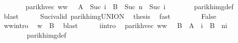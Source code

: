 \begin{isabellebody}
\ \ \ \ \isamarkupfalse%
\ \isamarkupfalse%
\ {\isachardoublequoteopen}parikh{\isacharunderscore}{\kern0pt}vec\ {\isacharparenleft}{\kern0pt}w{}{\isacharat}{\kern0pt}w{}{\isacharprime}{\kern0pt}{\isacharparenright}{\kern0pt}\ {\isasymin}\ {\isasymPsi}\ {\isacharparenleft}{\kern0pt}A\ {\isacharcircum}{\kern0pt}{\isacharcircum}{\kern0pt}\ {\isacharparenleft}{\kern0pt}Suc\ i{\isacharparenright}{\kern0pt}\ {\isacharat}{\kern0pt}{\isacharat}{\kern0pt}\ B\ {\isacharcircum}{\kern0pt}{\isacharcircum}{\kern0pt}\ {\isacharparenleft}{\kern0pt}Suc\ n\ {\isacharminus}{\kern0pt}\ Suc\ i{\isacharparenright}{\kern0pt}{\isacharparenright}{\kern0pt}{\isachardoublequoteclose}\isanewline
\ \ \ \ \ \ \isamarkupfalse%
\ parikh{\isacharunderscore}{\kern0pt}img{\isacharunderscore}{\kern0pt}def\ \isamarkupfalse%
\ blast\isanewline
\ \ \ \ \isamarkupfalse%
\ Suc{\isacharunderscore}{\kern0pt}i{\isacharunderscore}{\kern0pt}valid\ parikh{\isacharunderscore}{\kern0pt}img{\isacharunderscore}{\kern0pt}UNION\ \isamarkupfalse%
\ {\isacharquery}{\kern0pt}thesis\ \isamarkupfalse%
\ fast\isanewline
\ \ \isamarkupfalse%
\isanewline
\ \ \ \ \isamarkupfalse%
\ False\isanewline
\ \ \ \ \isamarkupfalse%
\ w{}{\isacharunderscore}{\kern0pt}w{}{\isacharunderscore}{\kern0pt}intro\ \isamarkupfalse%
\ {\isachardoublequoteopen}w{}\ {\isasymin}\ B{\isachardoublequoteclose}\ \isamarkupfalse%
\ blast\isanewline
\ \ \ \ \isamarkupfalse%
\ i{\isacharunderscore}{\kern0pt}intro\ \isamarkupfalse%
\ {\isachardoublequoteopen}parikh{\isacharunderscore}{\kern0pt}vec\ {\isacharparenleft}{\kern0pt}w{}{\isacharat}{\kern0pt}w{}{\isacharprime}{\kern0pt}{\isacharparenright}{\kern0pt}\ {\isasymin}\ {\isasymPsi}\ {\isacharparenleft}{\kern0pt}B\ {\isacharat}{\kern0pt}{\isacharat}{\kern0pt}\ A\ {\isacharcircum}{\kern0pt}{\isacharcircum}{\kern0pt}\ i\ {\isacharat}{\kern0pt}{\isacharat}{\kern0pt}\ B\ {\isacharcircum}{\kern0pt}{\isacharcircum}{\kern0pt}\ {\isacharparenleft}{\kern0pt}n{\isacharminus}{\kern0pt}i{\isacharparenright}{\kern0pt}{\isacharparenright}{\kern0pt}{\isachardoublequoteclose}\isanewline
\ \ \ \ \ \ \isamarkupfalse%
\ parikh{\isacharunderscore}{\kern0pt}img{\isacharunderscore}{\kern0pt}def\ \isamarkupfalse%

\end{isabellebody}
